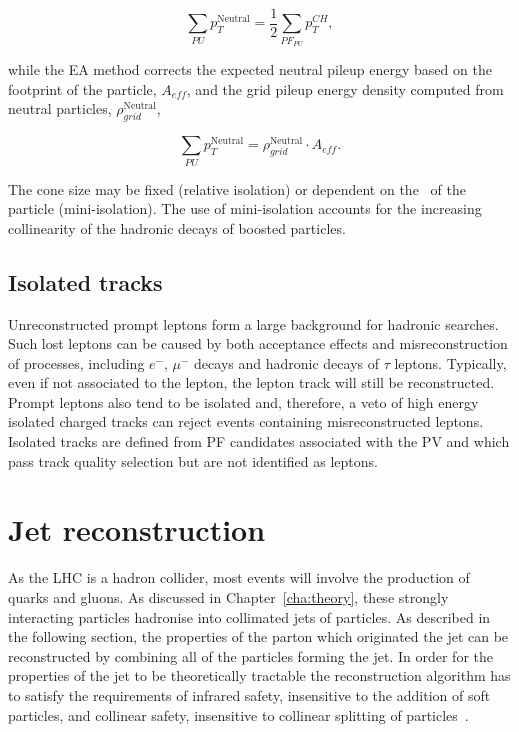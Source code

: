 \begin{equation}
\sum_{PU}p_T^{\text{Neutral}} = \frac{1}{2} \sum_{PF_{PU}}p_T^{CH},
\end{equation}

\noindent while the EA method corrects the expected neutral pileup energy based on the footprint of the particle, $A_{eff}$, and the grid pileup
energy density computed from neutral particles, $\rho_{grid}^{\text{Neutral}}$,

\begin{equation}
\sum_{PU}p_T^{\text{Neutral}} = \rho_{grid}^{\text{Neutral}}\cdot A_{eff}.
\end{equation}

\noindent The cone size may be fixed (relative isolation) or dependent on the \pt~of the particle (mini-isolation). The use of mini-isolation
accounts for the increasing collinearity of the hadronic decays of boosted particles. 

\subsection{Isolated tracks}

Unreconstructed prompt leptons form a large background for hadronic searches.
Such lost leptons can be caused by both acceptance effects and misreconstruction of 
processes, including $e^{-}$, $\mu^{-}$ decays and hadronic decays of $\tau$ leptons. 
Typically, even if not associated to the lepton, the lepton track will still be
reconstructed. Prompt leptons also tend to be isolated and, therefore, a veto of high energy isolated 
charged tracks can reject events containing misreconstructed leptons.
Isolated tracks are defined from PF candidates associated with the PV and 
which pass track quality selection but are not identified as leptons.

\section{Jet reconstruction} 
\label{sec:jet_reco}
As the LHC is a hadron collider, most events will involve the production of quarks and gluons. As discussed in
Chapter~\ref{cha:theory}, these strongly interacting particles hadronise into collimated jets of particles. As described 
in the following section, the properties of the parton which originated the
jet can be reconstructed by combining all of the particles forming the jet. In order for the properties of the jet to be theoretically tractable the
reconstruction algorithm has to satisfy the requirements of infrared safety, insensitive to the addition of 
soft particles, and collinear safety, insensitive to collinear splitting of particles~\cite{salam}.

